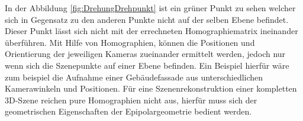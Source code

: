 In der Abbildung \ref{fig:DrehungDrehpunkt} ist ein grüner Punkt zu sehen welcher sich in Gegensatz zu den anderen Punkte nicht auf der selben Ebene befindet. Dieser Punkt lässt sich nicht mit der errechneten Homographiematrix ineinander überführen. Mit Hilfe von Homographien, können die Positionen und Orientierung der jeweiligen Kameras zueinander ermittelt werden, jedoch nur wenn sich die Szenepunkte auf einer Ebene befinden. Ein Beispiel hierfür wäre zum beispiel die Aufnahme einer Gebäudefassade aus unterschiedlichen Kamerawinkeln und Positionen\cite{Elements}. Für eine Szenenrekonstruktion einer kompletten 3D-Szene reichen pure Homographien nicht aus, hierfür muss sich der geometrischen Eigenschaften der Epipolargeometrie bedient werden. 



%
%
%
%
%
%
%
